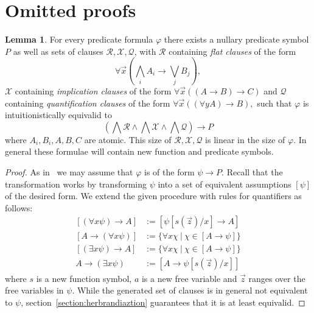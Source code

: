 \documentclass{easychair}
\theoremstyle{definition}
\theoremstyle{definition}
\theoremstyle{definition}
\newtheorem{lemma}[theorem]{Lemma}
\theoremstyle{definition}
\theoremstyle{definition}
\theoremstyle{definition}
\theoremstyle{definition}
\begin{document}
\newpage




\newpage

\appendix

\section{Omitted proofs}

\begin{lemma}\label{proof:first-order-normal-form}
		For every predicate formula $\varphi$ there exists a nullary predicate symbol $P$ as well as sets of clauses $\mathcal R,\mathcal X, \mathcal Q$, with $\mathcal R$ containing \emph{flat clauses} of the form
		$$\forall \vec x\left(\bigwedge_i A_i\to \bigvee_jB_j\right),$$
		$\mathcal X$ containing \emph{implication clauses} of the form
		$\forall \vec x\left((A\to B)\to C\right)$
		and $\mathcal Q$ containing \emph{quantification clauses} of the form
		$\forall\vec x\left((\forall y A)\to B\right),$
		such that $\varphi$ is intuitionistically equivalid to
		$$\left(\bigwedge\mathcal R\wedge\bigwedge \mathcal X\wedge\bigwedge\mathcal Q\right)\to P$$where $A_i, B_i, A, B, C$ are atomic. This size of $\mathcal R, \mathcal X, \mathcal Q$ is linear in the size of $\varphi$. In general these formulae will contain new function and predicate symbols.
\end{lemma}

\begin{proof}
	As in~\cite{otten2005clausal} we may assume that $\varphi$ is of the form $\psi\to P$. Recall that the transformation works by transforming $\psi$ into a set of equivalent assumptions $\left\lbrack \psi\right\rbrack$ of the desired form. We extend the given procedure with rules for quantifiers as follows:
	\begin{align*}
		\left\lbrack(\forall x \psi)\to A\right\rbrack&:= \left\lbrack\psi[s(\vec z)/x]\to A\right\rbrack\\
		\left\lbrack A\to (\forall x\psi)\right\rbrack&:= \{\forall x\chi\:|\:\chi\in\left\lbrack A\to\psi\right\rbrack\}\\
		\left\lbrack(\exists x\psi)\to A\right\rbrack&:= \{\forall x\chi\:|\:\chi\in\left\lbrack A\to\psi\right\rbrack\}\\
		A\to (\exists x\psi)&:= \left\lbrack A\to\psi[s(\vec z)/x]\right\rbrack
	\end{align*}
	where $s$ is a new function symbol, $a$ is a new free variable and $\vec z$ ranges over the free variables in $\psi$.
	While the generated set of clauses is in general not equivalent to $\psi$, section~\ref{section:herbrandiaztion} guarantees that it is at least equivalid.
\end{proof}
\end{document}
